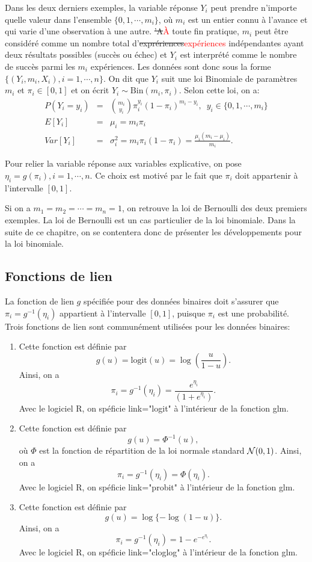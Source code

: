\documentclass[11pt]{article}
\begin{document}
\noindent Dans les deux derniers exemples, la variable réponse $Y_i$ peut prendre n'importe quelle valeur dans l'ensemble $\{0,1,\cdots,m_i\}$, où $m_i$ est un entier connu \`a l'avance et qui varie d'une observation \`a une autre. \sout{'A}\textcolor{red}{\`A} toute fin pratique, $m_i$ peut \^etre considéré comme un nombre total d'\sout{exprériences}\textcolor{red}{expériences} indépendantes ayant deux résultats possibles (succès ou échec) et $Y_i$ est interprété comme le nombre de succès parmi les $m_i$ expériences. Les données sont donc sous la forme $\{(Y_i,m_i,X_i), i=1,\cdots,n\}$. On dit que $Y_i$ suit une loi Binomiale de paramètres $m_i$ et $\pi_i \in [0,1]$ et on écrit $Y_i \sim \mbox{Bin}(m_i,\pi_i)$. Selon cette loi, on a:
\begin{eqnarray*}
P(Y_i=y_i)&=& \binom{m_i}{y_i} \pi_i^{y_i}(1-\pi_i)^{m_i-y_i}, \, \, \, y_i \in \{0,1,\cdots,m_i\}\\
E[Y_i] &=& \mu_i = m_i \pi_i \\
Var[Y_i] &=& \sigma^2_i = m_i \pi_i(1-\pi_i) = \frac{\mu_i(m_i-\mu_i)}{m_i}.
\end{eqnarray*}

\noindent Pour relier la variable réponse aux variables explicative, on pose $\eta_i=g(\pi_i), i=1,\cdots,n$. Ce choix est motivé par le fait que $\pi_i$ doit appartenir \`a l'intervalle $[0,1]$.

\noindent Si on a $m_1=m_2=\cdots=m_n=1$, on retrouve la loi de Bernoulli des deux premiers exemples. La loi de Bernoulli est un cas particulier de la loi binomiale. Dans la suite de ce chapitre, on se contentera donc de présenter les développements pour la loi binomiale.

\subsection{Fonctions de lien}

La fonction de lien $g$ spécifiée pour des données binaires doit s'assurer que $\pi_i=g^{-1}(\eta_i)$ appartient \`a l'intervalle $[0,1]$, puisque $\pi_i$ est une probabilité. Trois fonctions de lien sont communément utilisées pour les données binaires:
\begin{enumerate}
\item[{\bf Logit:}] Cette fonction est définie par $$g(u)=\mbox{logit}(u)=\log\left(\frac{u}{1-u}\right).$$
\noindent Ainsi, on a $$\pi_i=g^{-1}(\eta_i)=\frac{e^{\eta_i}}{(1+e^{\eta_i})}.$$ Avec le logiciel \textrm{R}, on spéficie \textsf{link="logit"} \`a l'intérieur de la fonction \textsf{glm}.
\item[{\bf Probit:}] Cette fonction est définie par $$g(u)=\Phi^{-1}(u),$$ où $\Phi$ est la fonction de répartition de la loi normale standard ${\cal N}(0,1)$.  Ainsi, on a $$\pi_i=g^{-1}(\eta_i)=\Phi(\eta_i).$$ Avec le logiciel \textrm{R}, on spéficie \textsf{link="probit"} \`a l'intérieur de la fonction \textsf{glm}.
\item[{\bf c-log-log:}] Cette fonction est définie par $$g(u)=\log\{-\log(1-u)\}.$$ Ainsi, on a $$\pi_i=g^{-1}(\eta_i)=1-e^{-e^{\eta_i}}.$$ Avec le logiciel \textrm{R}, on spéficie \textsf{link="cloglog"} \`a l'intérieur de la fonction \textsf{glm}.
\end{enumerate}
\end{document}
